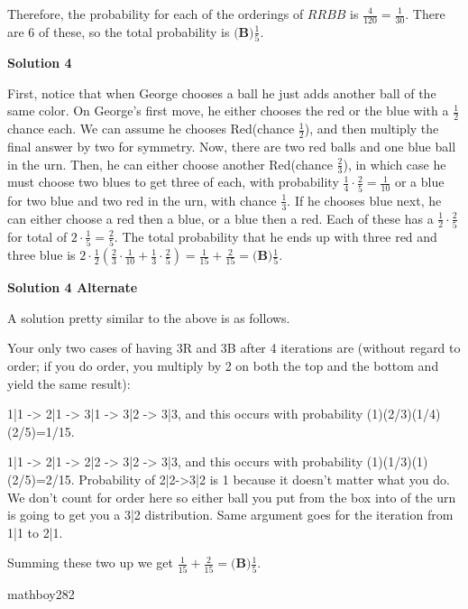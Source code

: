 \begin{enumerate}
 Therefore, the probability for each of the orderings of $RRBB$ is $\frac{4}{120}=\frac{1}{30}$. There are 6 of these, so the total probability is $\boxed{\textbf{(B)} \frac{1}{5}}$.

 



\textbf{Solution 4}

First, notice that when George chooses a ball he just adds another ball of the same color. On George's first move, he either chooses the red or the blue with a $\frac{1}{2}$ chance each. We can assume he chooses Red(chance $\frac{1}{2}$), and then multiply the final answer by two for symmetry. Now, there are two red balls and one blue ball in the urn. Then, he can either choose another Red(chance $\frac{2}{3}$), in which case he must choose two blues to get three of each, with probability $\frac{1}{4}\cdot\frac{2}{5}=\frac{1}{10}$ or a blue for two blue and two red in the urn, with chance $\frac{1}{3}$. If he chooses blue next, he can either choose a red then a blue, or a blue then a red. Each of these has a $\frac{1}{2}\cdot\frac{2}{5}$ for total of $2\cdot\frac{1}{5}=\frac{2}{5}$. The total probability that he ends up with three red and three blue is $2\cdot\frac{1}{2}(\frac{2}{3}\cdot\frac{1}{10}+\frac{1}{3}\cdot\frac{2}{5})=\frac{1}{15}+\frac{2}{15}=\boxed{\textbf{(B)} \frac{1}{5}}$.

 



\textbf{Solution 4 Alternate}

A solution pretty similar to the above is as follows.

 Your only two cases of having 3R and 3B after 4 iterations are (without regard to order; if you do order, you multiply by 2 on both the top and the bottom and yield the same result):

 1|1 -> 2|1 -> 3|1 -> 3|2 -> 3|3, and this occurs with probability (1)(2/3)(1/4)(2/5)=1/15.

 1|1 -> 2|1 -> 2|2 -> 3|2 -> 3|3, and this occurs with probability (1)(1/3)(1)(2/5)=2/15. Probability of 2|2->3|2 is 1 because it doesn't matter what you do. We don't count for order here so either ball you put from the box into of the urn is going to get you a 3|2 distribution. Same argument goes for the iteration from 1|1 to 2|1.

 Summing these two up we get $\frac{1}{15}+\frac{2}{15}=\boxed{\textbf{(B)} \frac{1}{5}}.$

 mathboy282

 




\end{enumerate}
